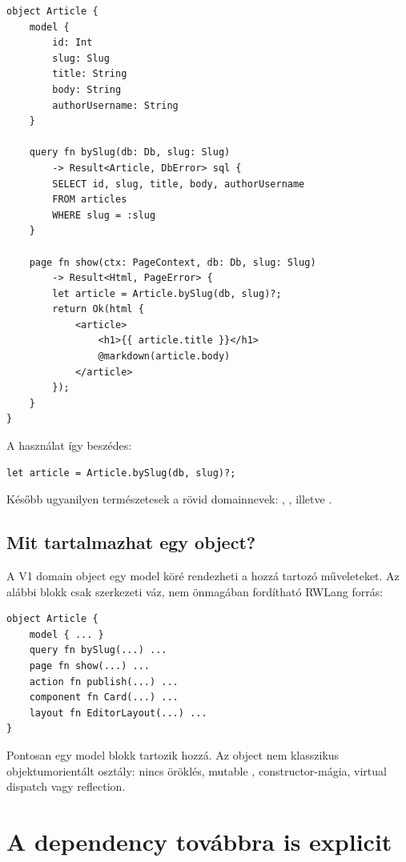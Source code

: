 \begin{lstlisting}[language=RWLang]
object Article {
    model {
        id: Int
        slug: Slug
        title: String
        body: String
        authorUsername: String
    }

    query fn bySlug(db: Db, slug: Slug)
        -> Result<Article, DbError> sql {
        SELECT id, slug, title, body, authorUsername
        FROM articles
        WHERE slug = :slug
    }

    page fn show(ctx: PageContext, db: Db, slug: Slug)
        -> Result<Html, PageError> {
        let article = Article.bySlug(db, slug)?;
        return Ok(html {
            <article>
                <h1>{{ article.title }}</h1>
                @markdown(article.body)
            </article>
        });
    }
}
\end{lstlisting}

A használat így beszédes:

\begin{lstlisting}[language=RWLang]
let article = Article.bySlug(db, slug)?;
\end{lstlisting}

Később ugyanilyen természetesek a rövid domainnevek: , , illetve .

\subsection*{Mit tartalmazhat egy object?}

A V1 domain object egy model köré rendezheti a hozzá tartozó műveleteket. Az alábbi blokk csak szerkezeti váz, nem önmagában fordítható RWLang forrás:

\begin{lstlisting}
object Article {
    model { ... }
    query fn bySlug(...) ...
    page fn show(...) ...
    action fn publish(...) ...
    component fn Card(...) ...
    layout fn EditorLayout(...) ...
}
\end{lstlisting}

Pontosan egy model blokk tartozik hozzá. Az object nem klasszikus objektumorientált osztály: nincs öröklés, mutable , constructor-mágia, virtual dispatch vagy reflection.

\section{A dependency továbbra is explicit}

